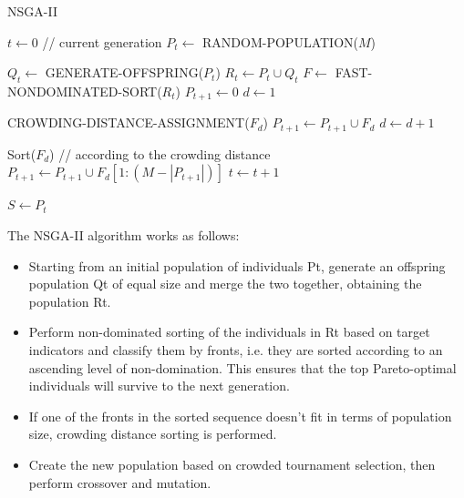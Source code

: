\begin{algorithm}
    \caption{NSGA-II}
    
    \begin{algorithmic}[1]
        \Begin
            \State $ t \leftarrow 0 $ // current generation
            \State $ P_t \leftarrow $ RANDOM-POPULATION($ M $) 

                \State $ Q_t \leftarrow $  GENERATE-OFFSPRING($ P_t $)
                \State $ R_t \leftarrow P_t \cup Q_t $
                \State $ F \leftarrow $  FAST-NONDOMINATED-SORT($ R_t $)
                \State $ P_{t + 1} \leftarrow 0 $
                \State $ d \leftarrow 1 $

                    CROWDING-DISTANCE-ASSIGNMENT($ F_d $)
                    \State $ P_{t + 1} \leftarrow P_{t + 1} \cup F_d $
                    \State $ d \leftarrow d + 1 $
                \EndWhile

                Sort($ F_d $) // according to the crowding distance
                \State $ P_{t + 1} \leftarrow P_{t + 1} \cup F_d[1: (M - |P_{t + 1}|)] $
                \State $ t \leftarrow t + 1 $
            \EndWhile

            \State $ S \leftarrow P_t $
        \End
    \end{algorithmic}
\end{algorithm}

The NSGA-II algorithm works as follows:
\begin{itemize}
    \item Starting from an initial population of individuals Pt, generate an offspring population Qt of equal size and merge the two together, obtaining the population Rt.
    \item Perform non-dominated sorting of the individuals in Rt based on target indicators and classify them by fronts, i.e. they are sorted according to an ascending level of non-domination.  This ensures that the top Pareto-optimal individuals will survive to the next generation.
    \item If one of the fronts in the sorted sequence doesn't fit in terms of population size, crowding distance sorting is performed.
    \item Create the new population based on crowded tournament selection, then perform crossover and mutation. 
\end{itemize}


